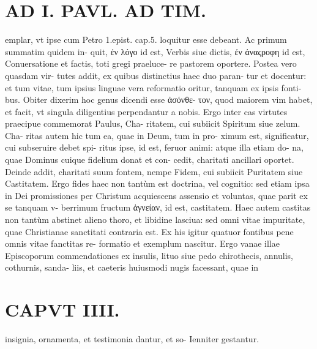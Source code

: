 \documentclass{article}
\begin{document}
\begin{pages}
\section*{AD I. PAVL. AD TIM. }
\marginpar{[ p.230 ]}\pstart emplar, vt ipse cum Petro 1.epist. cap.5. loquitur esse debeant. Ac primum summatim quidem in- quit, ἐν λόγο id est, Verbis siue dictis, ἐν ἀναςροφη id est, Conuersatione et factis, toti gregi praeluce- re pastorem oportere. Postea vero quasdam vir- tutes addit, ex quibus distinctius haec duo paran- tur et docentur: et tum vitae, tum ipsius linguae vera reformatio oritur, tanquam ex ipsis fonti- bus. Obiter dixerim hoc genus dicendi esse ἀσόνθε- τον, quod maiorem vim habet, et facit, vt singula diligentius perpendantur a nobis. Ergo inter cas virtutes praecipue commemorat Paulus, Cha- ritatem, cui subiicit Spiritum siue zelum. Cha- ritas autem hic tum ea, quae in Deum, tum in pro- ximum est, significatur, cui subseruire debet spi- ritus ipse, id est, feruor animi: atque illa etiam do- na, quae Dominus cuique fidelium donat et con- cedit, charitati ancillari oportet. Deinde addit, charitati suum fontem, nempe Fidem, cui subiicit Puritatem siue Castitatem. Ergo fides haec non tantùm est doctrina, vel cognitio: sed etiam ipsa in Dei promissiones per Christum acquiescens assensio et voluntas, quae parit ex se tanquam v- berrimum fructum ἁγνείαν, id est, castitatem. Haec autem castitas non tantùm abstinet alieno thoro, et libidine lasciua: sed omni vitae impuritate, quae Christianae sanctitati contraria est. Ex his igitur quatuor fontibus pene omnis vitae fanctitas re- formatio et exemplum nascitur. Ergo vanae illae Episcoporum commendationes ex insulis, lituo siue pedo chirothecis, annulis, cothurnis, sanda- liis, et caeteris huiusmodi nugis facessant, quae in  \pend
\section*{CAPVT  IIII. }
\marginpar{[ p.231 ]}\pstart insignia, ornamenta, et testimonia dantur, et so- Ienniter gestantur.  \pend
{}
{}

\end{pages}
\end{document}
